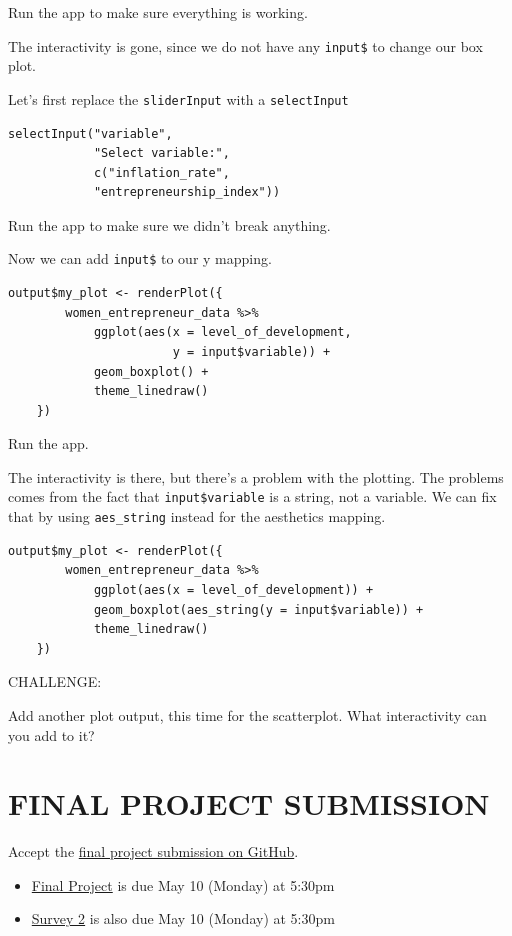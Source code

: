 \documentclass[
]{book}
\begin{document}
Run the app to make sure everything is working.

The interactivity is gone, since we do not have any \texttt{input\$} to change our box plot.

Let's first replace the \texttt{sliderInput} with a \texttt{selectInput}

\begin{verbatim}
selectInput("variable",
            "Select variable:", 
            c("inflation_rate",
            "entrepreneurship_index"))
\end{verbatim}

Run the app to make sure we didn't break anything.

Now we can add \texttt{input\$} to our y mapping.

\begin{verbatim}
output$my_plot <- renderPlot({
        women_entrepreneur_data %>%
            ggplot(aes(x = level_of_development,
                       y = input$variable)) +
            geom_boxplot() +
            theme_linedraw()
    })
\end{verbatim}

Run the app.

The interactivity is there, but there's a problem with the plotting. The problems comes from the fact that \texttt{input\$variable} is a string, not a variable. We can fix that by using \texttt{aes\_string} instead for the aesthetics mapping.

\begin{verbatim}
output$my_plot <- renderPlot({
        women_entrepreneur_data %>%
            ggplot(aes(x = level_of_development)) +
            geom_boxplot(aes_string(y = input$variable)) +
            theme_linedraw()
    })
\end{verbatim}

CHALLENGE:

Add another plot output, this time for the scatterplot. What interactivity can you add to it?

\hypertarget{final-project-submission}{%
\section{FINAL PROJECT SUBMISSION}\label{final-project-submission}}

Accept the \href{}{final project submission on GitHub}.

\begin{itemize}
\item
  \href{}{Final Project} is due May 10 (Monday) at 5:30pm
\item
  \href{}{Survey 2} is also due May 10 (Monday) at 5:30pm
\end{itemize}

  
\end{document}
